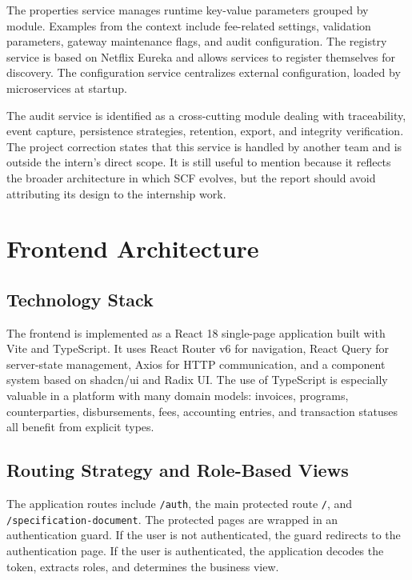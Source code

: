 The properties service manages runtime key-value parameters grouped by module. Examples from the context include fee-related settings, validation parameters, gateway maintenance flags, and audit configuration. The registry service is based on Netflix Eureka and allows services to register themselves for discovery. The configuration service centralizes external configuration, loaded by microservices at startup.

The audit service is identified as a cross-cutting module dealing with traceability, event capture, persistence strategies, retention, export, and integrity verification. The project correction states that this service is handled by another team and is outside the intern's direct scope. It is still useful to mention because it reflects the broader architecture in which SCF evolves, but the report should avoid attributing its design to the internship work.

\section{Frontend Architecture}
\label{sec:frontend_architecture}

\subsection{Technology Stack}
\label{subsec:frontend_stack}

The frontend is implemented as a React 18 single-page application built with Vite and TypeScript. It uses React Router v6 for navigation, React Query for server-state management, Axios for HTTP communication, and a component system based on shadcn/ui and Radix UI. The use of TypeScript is especially valuable in a platform with many domain models: invoices, programs, counterparties, disbursements, fees, accounting entries, and transaction statuses all benefit from explicit types.

\subsection{Routing Strategy and Role-Based Views}
\label{subsec:routing_role_views}

The application routes include \texttt{/auth}, the main protected route \texttt{/}, and \texttt{/specification-document}. The protected pages are wrapped in an authentication guard. If the user is not authenticated, the guard redirects to the authentication page. If the user is authenticated, the application decodes the token, extracts roles, and determines the business view.

